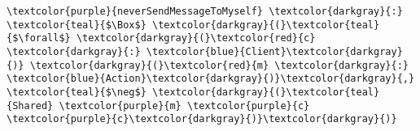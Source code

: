 \begin{Verbatim}[commandchars=\\\{\},codes={\catcode`$=3}]
\textcolor{purple}{neverSendMessageToMyself} \textcolor{darkgray}{:} \textcolor{teal}{$\Box$} \textcolor{darkgray}{(}\textcolor{teal}{$\forall$} \textcolor{darkgray}{(}\textcolor{red}{c} \textcolor{darkgray}{:} \textcolor{blue}{Client}\textcolor{darkgray}{)} \textcolor{darkgray}{(}\textcolor{red}{m} \textcolor{darkgray}{:} \textcolor{blue}{Action}\textcolor{darkgray}{)}\textcolor{darkgray}{,} \textcolor{teal}{$\neg$} \textcolor{darkgray}{(}\textcolor{teal}{Shared} \textcolor{purple}{m} \textcolor{purple}{c} \textcolor{purple}{c}\textcolor{darkgray}{)}\textcolor{darkgray}{)}
\end{Verbatim}
